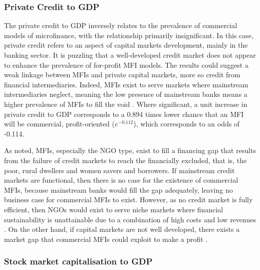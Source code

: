 \documentclass[a4paper,nobind]{templates/ociamthesis}
\begin{document}
\hypertarget{private-credit-to-gdp}{%
\subsubsection{Private Credit to GDP}\label{private-credit-to-gdp}}

The private credit to GDP inversely relates to the prevalence of commercial models of microfinance, with the relationship primarily insignificant. In this case, private credit refers to an aspect of capital markets development, mainly in the banking sector. It is puzzling that a well-developed credit market does not appear to enhance the prevalence of for-profit MFI models. The results could suggest a weak linkage between MFIs and private capital markets, more so credit from financial intermediaries. Indeed, MFIs exist to serve markets where mainstream intermediaries neglect, meaning the low presence of mainstream banks means a higher prevalence of MFIs to fill the void \autocite{de2007economics}. Where significant, a unit increase in private credit to GDP corresponds to a 0.894 times lower chance that an MFI will be commercial, profit-oriented (\(e^{-0.112}\)), which corresponds to an odds of -0.114.

As noted, MFIs, especially the NGO type, exist to fill a financing gap that results from the failure of credit markets to reach the financially excluded, that is, the poor, rural dwellers and women savers and borrowers. If mainstream credit markets are functional, then there is no case for the existence of commercial MFIs, because mainstream banks would fill the gap adequately, leaving no business case for commercial MFIs to exist. However, as no credit market is fully efficient, then NGOs would exist to serve niche markets where financial sustainability is unattainable due to a combination of high costs and low revenues \autocite{de2007economics}. On the other hand, if capital markets are not well developed, there exists a market gap that commercial MFIs could exploit to make a profit \autocite{d2013unsubsidized,armendariz2013subsidy}.

\hypertarget{stock-market-capitalisation-to-gdp}{%
\subsubsection{Stock market capitalisation to GDP}\label{stock-market-capitalisation-to-gdp}}
\end{document}
